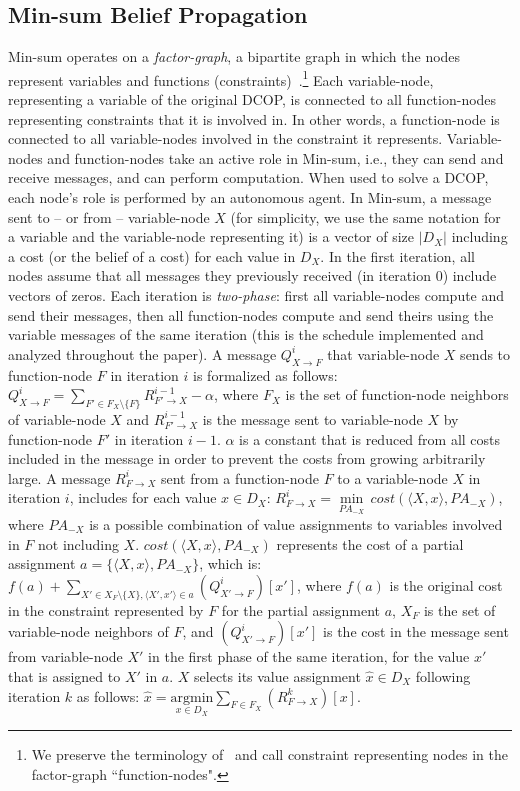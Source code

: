 \documentclass[letterpaper]{article} %
\theoremstyle{definition}
\theoremstyle{remark}
\begin{document}
\subsection{Min-sum Belief Propagation}
\label{secmaxsum}
Min-sum operates on a \emph{factor-graph}, a bipartite graph in which the nodes represent variables and functions (constraints)~\cite{KschischangFL01}.\footnote{We preserve the terminology of~\cite{FarinelliRPJ08} and call constraint representing nodes in the factor-graph ``function-nodes".}
Each variable-node, representing a variable of the original DCOP, is connected to all function-nodes representing constraints that it is involved in. In other words, a function-node is connected to all variable-nodes involved in the constraint it represents.
Variable-nodes and function-nodes take an active role in Min-sum, i.e., they can send and receive messages, and can perform computation. When used to solve a DCOP, each node's role is performed by an autonomous agent.
In Min-sum, a message sent to -- or from -- variable-node $X$ (for simplicity, we use the same notation for a variable and the variable-node representing it) is a vector of size $|D_X|$ including a cost (or the belief of a cost) for each value in $D_X$.
In the first iteration, all nodes assume that all messages they previously received (in iteration $0$) include vectors of zeros. Each iteration is \emph{two-phase}: first all variable-nodes compute and send their messages, then all function-nodes compute and send theirs using the variable messages of the same iteration (this is the schedule implemented and analyzed throughout the paper). A message $Q_{X \rightarrow F}^i$ that variable-node $X$ sends to function-node $F$ in iteration $i$ is formalized as follows:
$Q_{X \rightarrow F}^i =\underset{F'\in F_X \setminus \{ F\} }{ \sum} R_{F' \rightarrow X}^{i-1} - \alpha$,
where $F_X$ is the set of function-node neighbors of variable-node $X$ and $R_{F' \rightarrow X}^{i-1}$ is the message sent to variable-node $X$ by function-node $F'$ in iteration $i-1$.
$\alpha$ is a constant that is reduced from all costs included in the message in order to prevent the costs from growing arbitrarily large.
A message $R_{F \rightarrow X}^{i}$ sent from a function-node $F$ to a variable-node $X$ in iteration $i$,
includes for each value $x \in D_X$:
$R_{F \rightarrow X}^{i} = \underset{{PA_{-X}}} \min\, cost (\langle X , x \rangle, PA_{-X})$,
where $PA_{-X}$ is a possible combination of value assignments to variables involved in $F$ not including $X$. $cost(\langle X , x \rangle, PA_{-X})$ represents the cost of a partial assignment $a = \{ \langle X, x \rangle, PA_{-X} \}$, which is:
$f(a) + \underset{X' \in X_F \setminus \{X\},\langle X',x' \rangle \in a}{\sum} (Q_{X' \rightarrow F}^{i})[x']$,
where $f(a)$ is the original cost in the constraint represented by $F$ for the partial assignment $a$, $X_F$ is the set of variable-node neighbors of $F$, and $(Q_{X' \rightarrow F}^{i})[x']$ is the cost in the message sent from variable-node $X'$ in the first phase of the same iteration, for the value $x'$ that is assigned to $X'$ in $a$.
$X$ selects its value assignment $\hat{x} \in D_X$ following iteration $k$ as follows:
$\hat{x} = \underset{x\in D_X}{\mathrm{argmin}} \sum_{F\in F_X} (R_{F \rightarrow X}^k)[x]$.
\end{document}

